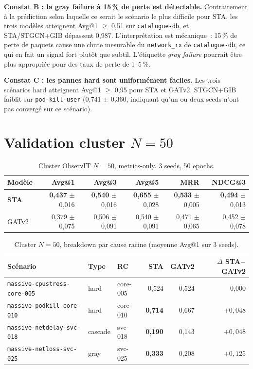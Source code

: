 \documentclass[a4paper,11pt,oneside]{report}
\begin{document}
\textbf{Constat B : la gray failure \`a 15\,\% de perte est d\'etectable.} Contrairement \`a la pr\'ediction selon laquelle ce serait le sc\'enario le plus difficile pour STA, les trois mod\`eles atteignent Avg@1 $\ge$ 0{,}51 sur \texttt{catalogue-db}, et STA/STGCN+GIB d\'epassent 0{,}987. L'interpr\'etation est m\'ecanique~: 15\,\% de perte de paquets cause une chute mesurable du \texttt{network\_rx} de \texttt{catalogue-db}, ce qui en fait un signal fort plut\^ot que subtil. L'\'etiquette \emph{gray failure} pourrait \^etre plus appropri\'ee pour des taux de perte de 1--5\,\%.

\textbf{Constat C : les pannes hard sont uniform\'ement faciles.} Les trois sc\'enarios hard atteignent Avg@1 $\ge$ 0{,}95 pour STA et GATv2. STGCN+GIB faiblit sur \texttt{pod-kill-user} (0{,}741 $\pm$ 0{,}360, indiquant qu'un ou deux seeds n'ont pas converg\'e sur ce sc\'enario).

\section{Validation cluster $N{=}50$}
\label{sec:resultats-n50}

\begin{table}[ht]
\centering
\caption{Cluster ObservIT $N{=}50$, metrics-only. 3 seeds, 50 epochs.}
\label{tab:n50-summary}
\begin{tabular}{lrrrrr}
\toprule
Mod\`ele & Avg@1 & Avg@3 & Avg@5 & MRR & NDCG@3 \\
\midrule
\textbf{STA} & \textbf{0{,}437} $\pm$ 0{,}016 & \textbf{0{,}540} $\pm$ 0{,}016 & \textbf{0{,}655} $\pm$ 0{,}028 & \textbf{0{,}533} $\pm$ 0{,}005 & \textbf{0{,}494} $\pm$ 0{,}013 \\
GATv2 & 0{,}379 $\pm$ 0{,}075 & 0{,}506 $\pm$ 0{,}091 & 0{,}540 $\pm$ 0{,}091 & 0{,}471 $\pm$ 0{,}065 & 0{,}452 $\pm$ 0{,}078 \\
\bottomrule
\end{tabular}
\end{table}

\begin{table}[ht]
\centering
\caption{Cluster $N{=}50$, breakdown par cause racine (moyenne Avg@1 sur 3 seeds).}
\label{tab:n50-per-rc}
\begin{tabular}{lllrrr}
\toprule
Sc\'enario & Type & RC & STA & GATv2 & $\Delta$ STA$-$GATv2 \\
\midrule
\texttt{massive-cpustress-core-005} & hard & core-005 & 0{,}524 & 0{,}524 & 0{,}000 \\
\texttt{massive-podkill-core-010} & hard & core-010 & \textbf{0{,}714} & 0{,}667 & $+0{,}048$ \\
\texttt{massive-netdelay-svc-018} & cascade & svc-018 & \textbf{0{,}190} & 0{,}143 & $+0{,}048$ \\
\texttt{massive-netloss-svc-025} & gray & svc-025 & \textbf{0{,}333} & 0{,}208 & $+0{,}125$ \\
\bottomrule
\end{tabular}
\end{table}
\end{document}
